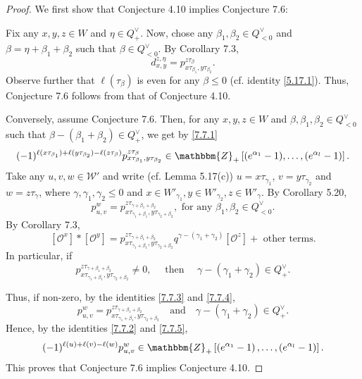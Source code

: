 \documentclass{article}
\def\W{\mathcal{W}}
\def\ref#1{#1}
\begin{document}
\begin{proof}
We first show that Conjecture \ref{4.10}  implies Conjecture \ref{7.6}:

 Fix any $x,y,z \in W$ and $\eta \in Q_+^\vee$. Now, chose any $\beta_1, \beta_2 \in Q_{<0}^\vee$ and $\beta=\eta+\beta_1+\beta_2$ such that $\beta\in Q_{<0}^\vee$. By Corollary \ref{7.3}, 
\begin{equation}\label{7.7.1}
d^{z, \eta}_{x,y} = p_{x\tau_{\beta_1},y \tau_{\beta_2}}^{z\tau_\beta}.
\end{equation}
Observe further that $\ell(\tau_\beta)$ is even for any $\beta\leq 0$ (cf. identity \eqref{5.17.1}). Thus, Conjecture \ref{7.6} follows from that of Conjecture \ref{4.10}. 

Conversely, assume Conjecture \ref{7.6}. Then, for any $x,y,z \in W $ and $\beta,\beta_1,\beta_2 \in Q_{<0}^\vee	$ such that $\beta-\left( \beta_1+ \beta_2\right) \in Q_+^\vee $, we get by \eqref{7.7.1}
\begin{equation}\label{7.7.2}
(-1)^{\ell(x\tau_{\beta_1})+\ell(y\tau_{\beta_2})-\ell(z\tau_\beta)}p_{x\tau_{\beta_1},y \tau_{\beta_2}}^{z\tau_\beta} \in \mathbbm{Z}_+ \left[ (e^{\alpha_1}-1), \ldots ,(e^{\alpha_l}-1)\right].
\end{equation}
Take any $u,v,w\in \W'$ and write (cf. Lemma \ref{5.17}(c)) $u=x\tau_{\gamma_1}$, $v=y\tau_{\gamma_2}$ and $w=z\tau_\gamma$, where $\gamma, \gamma_1, \gamma_2 \leq 0$ and $x\in W'_{\gamma_1}, y\in W'_{\gamma_2}, z\in W'_\gamma$. By Corollary \ref{5.20},
\begin{equation}\label{7.7.3}
p_{u,v}^w = p^{z\tau_{\gamma+\beta_1+\beta_2}}_{x\tau_{\gamma_1+\beta_1},y\tau_{\gamma_2+\beta_2}},\mbox{ for any}\,\, \beta_1,\beta_2 \in  Q_{<0}^\vee.
\end{equation}
By Corollary \ref{7.3}, 
$$
\left[ \mathcal{O}^x\right] *\left[ \mathcal{O}^y\right] =p^{z\tau_{\gamma+\beta_1+\beta_2}}_{x\tau_{\gamma_1+\beta_1},y\tau_{\gamma_2+\beta_2}} q^{\gamma -(\gamma_1+\gamma_2)} \left[ \mathcal{O}^{z}\right] + \mbox{ other terms.}
$$
In particular, if 
\begin{equation}\label{7.7.4}
 p^{z\tau_{\gamma+\beta_1+\beta_2}}_{x\tau_{\gamma_1+\beta_1},y\tau_{\gamma_2+\beta_2}} \neq 0,\quad \mbox{ then }\quad \gamma- (\gamma_1+\gamma_2)\in Q_+^\vee .
\end{equation}

Thus, if non-zero, by the identities \eqref{7.7.3} and \eqref{7.7.4},
\begin{equation}\label{7.7.5}
p_{u,v}^w = p^{z\tau_{\gamma+\beta_1+\beta_2}}_{x\tau_{\gamma_1+\beta_1},y\tau_{\gamma_2+\beta_2}}\quad \mbox{and} \quad \gamma- (\gamma_1+\gamma_2)\in Q_+^\vee. 
\end{equation}
Hence, by the identities \eqref{7.7.2} and \eqref{7.7.5}, 
$$
(-1)^{\ell(u)+\ell(v)-\ell(w)}p_{u,v}^w \in \mathbbm{Z}_+ \left[\left( e^{\alpha_1}-1\right),\ldots, \left(  e^{\alpha_l}-1\right)\right].
$$
 This proves that Conjecture \ref{7.6} implies Conjecture \ref{4.10}. 
\end{proof}
\end{document}
